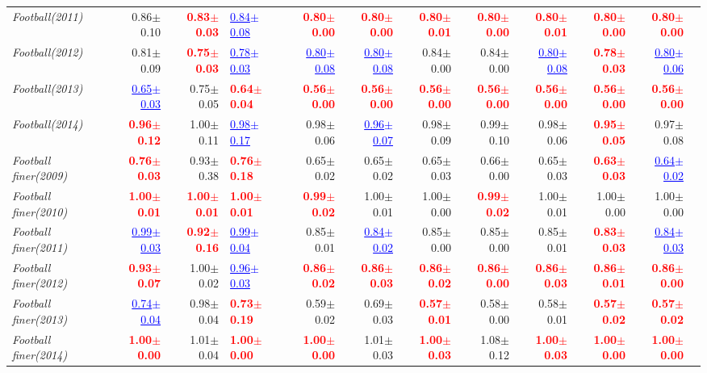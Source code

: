 \documentclass[nohyperref]{article}
\theoremstyle{plain}
\theoremstyle{definition}
\theoremstyle{remark}
\newcommand{\red}[1]{\textcolor{red}{\textbf{#1}}}
\newcommand{\blue}[1]{\textcolor{blue}{\underline{#1}}}
\begin{document}
\begin{table*}[tb!]
{\begin{tabular}{l|rr p{5em}| rrrrrrrr}
			{\it Football(2011)} & 0.86$\pm$0.10 & \red{0.83$\pm$0.03} & \blue{0.84$\pm$0.08} & \red{0.80$\pm$0.00} & \red{0.80$\pm$0.00} & \red{0.80$\pm$0.01} & \red{0.80$\pm$0.00} & \red{0.80$\pm$0.01} & \red{0.80$\pm$0.00} & \red{0.80$\pm$0.00} \\
			{\it Football(2012)} & 0.81$\pm$0.09 & \red{0.75$\pm$0.03} & \blue{0.78$\pm$0.03} & \blue{0.80$\pm$0.08} & \blue{0.80$\pm$0.08} & 0.84$\pm$0.00 & 0.84$\pm$0.00 & \blue{0.80$\pm$0.08} & \red{0.78$\pm$0.03} & \blue{0.80$\pm$0.06} \\
			{\it Football(2013)} & \blue{0.65$\pm$0.03} & 0.75$\pm$0.05 & \red{0.64$\pm$0.04} & \red{0.56$\pm$0.00} & \red{0.56$\pm$0.00} & \red{0.56$\pm$0.00} & \red{0.56$\pm$0.00} & \red{0.56$\pm$0.00} & \red{0.56$\pm$0.00} & \red{0.56$\pm$0.00} \\
			{\it Football(2014)} & \red{0.96$\pm$0.12} & 1.00$\pm$0.11 & \blue{0.98$\pm$0.17} & 0.98$\pm$0.06 & \blue{0.96$\pm$0.07} & 0.98$\pm$0.09 & 0.99$\pm$0.10 & 0.98$\pm$0.06 & \red{0.95$\pm$0.05} & 0.97$\pm$0.08 \\
			{\it Football finer(2009)} & \red{0.76$\pm$0.03} & 0.93$\pm$0.38 & \red{0.76$\pm$0.18} & 0.65$\pm$0.02 & 0.65$\pm$0.02 & 0.65$\pm$0.03 & 0.66$\pm$0.00 & 0.65$\pm$0.03 & \red{0.63$\pm$0.03} & \blue{0.64$\pm$0.02} \\
			{\it Football finer(2010)} & \red{1.00$\pm$0.01} & \red{1.00$\pm$0.01} & \red{1.00$\pm$0.01} & \red{0.99$\pm$0.02} & 1.00$\pm$0.01 & 1.00$\pm$0.00 & \red{0.99$\pm$0.02} & 1.00$\pm$0.01 & 1.00$\pm$0.00 & 1.00$\pm$0.00 \\
			{\it Football finer(2011)} & \blue{0.99$\pm$0.03} & \red{0.92$\pm$0.16} & \blue{0.99$\pm$0.04} & 0.85$\pm$0.01 & \blue{0.84$\pm$0.02} & 0.85$\pm$0.00 & 0.85$\pm$0.00 & 0.85$\pm$0.01 & \red{0.83$\pm$0.03} & \blue{0.84$\pm$0.03} \\
			{\it Football finer(2012)} & \red{0.93$\pm$0.07} & 1.00$\pm$0.02 & \blue{0.96$\pm$0.03} & \red{0.86$\pm$0.02} & \red{0.86$\pm$0.03} & \red{0.86$\pm$0.02} & \red{0.86$\pm$0.00} & \red{0.86$\pm$0.03} & \red{0.86$\pm$0.01} & \red{0.86$\pm$0.00} \\
			{\it Football finer(2013)} & \blue{0.74$\pm$0.04} & 0.98$\pm$0.04 & \red{0.73$\pm$0.19} & 0.59$\pm$0.02 & 0.69$\pm$0.03 & \red{0.57$\pm$0.01} & 0.58$\pm$0.00 & 0.58$\pm$0.01 & \red{0.57$\pm$0.02} & \red{0.57$\pm$0.02} \\
			{\it Football finer(2014)} & \red{1.00$\pm$0.00} & 1.01$\pm$0.04 & \red{1.00$\pm$0.00} & \red{1.00$\pm$0.00} & 1.01$\pm$0.03 & \red{1.00$\pm$0.03} & 1.08$\pm$0.12 & \red{1.00$\pm$0.03} & \red{1.00$\pm$0.00} & \red{1.00$\pm$0.00} \\
			\bottomrule
		\end{tabular}}
\end{table*}
\end{document}
